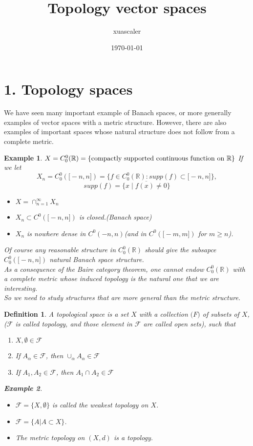 \documentclass{article}
\title{Topology vector spaces}
\author{xuascaler}
\date{\today}
\newtheorem*{definition}{Definition}
\newtheorem*{example}{Example}
\begin{document}
\maketitle

\section*{1. Topology spaces}
We have seen many important example of Banach spaces, 
or more generally examples of vector spaces with a metric structure.
However, there are also examples of important spaces 
whose natural structure does not follow from a complete metric.
\begin{example}
    $X = C_0^0(\mathbb{R}) = \{ \textnormal{compactly supported continuous function on } \mathbb{R}\}$
    If we let
    \[
        X_n = C_0^0(\bigl[-n, n \bigr]) = \{f \in C_0^0(\mathbb{R}): supp(f) \subset \bigl[ -n, n\bigr]\},
    \]
    \[
        supp(f)=\overline{\{x \mid f(x) \ne 0\}}
    \]
    \begin{itemize}
        \item $X = \cap_{n=1}^{\infty}{X_n}$
        \item $X_n \subset C^0(\bigl[-n, n\bigr])$ is closed.(Banach space)
        \item $X_n$ is nowhere dense in $C^0(-n, n)$(and in $C^0(\bigl[-m,m\bigr])$ for $m \ge n$).
    \end{itemize}
    Of course any reasonable structure in 
    $C_0^0(\mathbb{R})$ 
    should give the subsapce $C_0^0(\bigl[ -n, n \bigr])$ natural Banach space structure.\\
    As a consequence of the Baire category theorem, one cannot endow $C_0^0(\mathbb{R})$ with
    a complete metric whose induced topology is the natural one that we are interesting. \\
    So we need to study structures that are more general than the metric structure.
\end{example}
\begin{definition}
    A topological space is a set $X$ with a collection $\mathcal(F)$ of subsets of $X$,
    ($\mathcal{F}$ is called topology, and those element in $\mathcal{F}$ are called open sets),
    such that
    \begin{enumerate}
        \item $X, \emptyset \in \mathcal{F}$
        \item If $A_{\alpha} \in \mathcal{F}$, then $\cup_{\alpha}{A_{\alpha}} \in \mathcal{F}$
        \item If $A_1, A_2 \in \mathcal{F}$, then $A_1 \cap A_2 \in \mathcal{F}$
    \end{enumerate}
    \begin{example}
        \begin{itemize}
            \item $\mathcal{F} = \{X, \emptyset\}$ is called the weakest topology on $X$.
            \item $\mathcal{F} = \{ A | A \subset X \}$.
            \item The metric topology on $(X, d)$ is a topology.
        \end{itemize}
    \end{example}
\end{definition}
\end{document}
